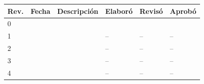 \begin{titlepage}
\begin{table}[h]
\begin{tabularx}{\textwidth}{@{}llXlll@{}}
			\textbf{Rev.} & \textbf{Fecha}  & \textbf{Descripción} & \textbf{Elaboró} & \textbf{Revisó} & \textbf{Aprobó} \\
			\midrule
			0             & \fechaRevCero   & \descRevCero         & \firmaElaboro    & \firmaReviso    & \firmaAprobo    \\
			1             & \fechaRevUno    & \descRevUno          & --               & --              & --              \\
			2             & \fechaRevDos    & \descRevDos          & --               & --              & --              \\
			3             & \fechaRevTres   & \descRevTres         & --               & --              & --              \\
			4             & \fechaRevCuatro & \descRevCuatro       & --               & --              & --              \\
			\bottomrule
		\end{tabularx}
	\end{table}

\end{titlepage}

\newpage

